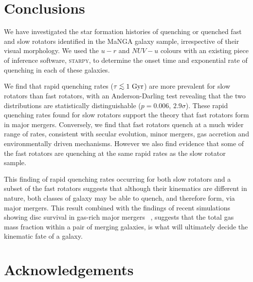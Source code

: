 \documentclass[useAMS,usenatbib]{mn2e}
\def\lesssim{\mathrel{\hbox{\rlap{\hbox{\lower3pt\hbox{$\sim$}}}\hbox{\raise2pt\hbox{$<$}}}}}
\begin{document}

\section{Conclusions}

We have investigated the star formation histories of quenching or quenched fast and slow rotators identified in the MaNGA galaxy sample, irrespective of their visual morphology. We used the $u-r$ and $NUV-u$ colours with an existing piece of inference software, \textsc{starpy}, to determine the onset time and exponential rate of quenching in each of these galaxies. 

We find that rapid quenching rates ($\tau \lesssim 1~\rm{Gyr}$) are more prevalent for slow rotators than fast rotators, with an Anderson-Darling test revealing that the two distributions are statistically distinguishable ($p=0.006$, $2.9\sigma$). These rapid quenching rates found for slow rotators support the theory that fast rotators form in major mergers. Conversely, we find that fast rotators quench at a much wider range of rates, consistent with secular evolution, minor mergers, gas accretion and environmentally driven mechanisms. However we also find evidence that some of the fast rotators are quenching at the same rapid rates as the slow rotator sample.

This finding of rapid quenching rates occurring for both slow rotators and a subset of the fast rotators suggests that although their kinematics are different in nature, both classes of galaxy may be able to quench, and therefore form, via major mergers. This result combined with the findings of recent simulations showing disc survival in gas-rich major mergers ~\citep{bois11, pontzen16, sparre16}, suggests that the total gas mass fraction within a pair of merging galaxies, is what will ultimately decide the kinematic fate of a galaxy. 
	
\section*{Acknowledgements}
\end{document}
